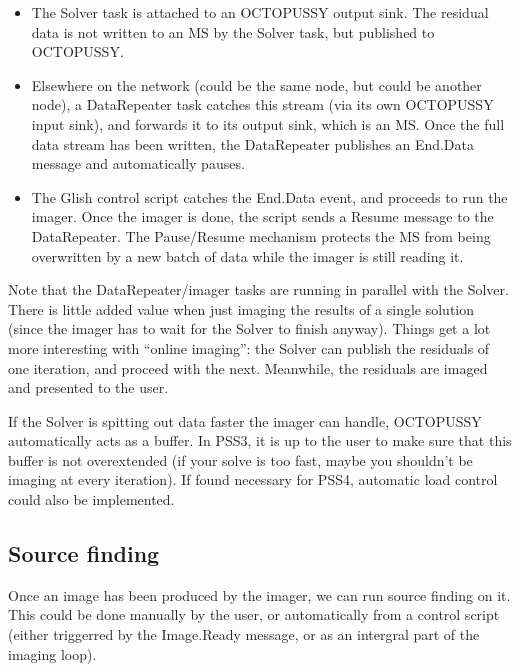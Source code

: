 \documentclass[12pt]{article}
\begin{document}
  \begin{itemize}
  
  \item The Solver task is attached to an OCTOPUSSY output sink. The residual
  data is not written to an MS by the Solver task, but published to OCTOPUSSY. 

  \item Elsewhere on the network (could be the same node, but could be another
  node), a DataRepeater task catches this stream (via its own OCTOPUSSY input
  sink), and forwards it to its output sink, which is an MS. Once the full data
  stream has been written, the DataRepeater publishes an End.Data message and
  automatically pauses.

  \item The Glish control script catches the End.Data event, and proceeds to
  run the imager. Once the imager is done, the script sends a Resume message to
  the DataRepeater. The Pause/Resume mechanism protects the MS from being
  overwritten by a new batch of data while the imager is still reading it.

  \end{itemize}
  
  Note that the DataRepeater/imager tasks are running in parallel with the
  Solver. There is little added value when just imaging the results of a single
  solution (since the imager has to wait for the Solver to finish anyway).
  Things get a lot more interesting with ``online imaging'': the Solver can
  publish the residuals of one iteration, and proceed with the next. Meanwhile,
  the residuals are imaged and presented to the user. 

  If the Solver is spitting out data faster the imager can handle, OCTOPUSSY
  automatically acts as a buffer. In PSS3, it is up to the user to make sure
  that this buffer is not overextended (if your solve is too fast, maybe you
  shouldn't be imaging at every iteration). If found necessary for PSS4,
  automatic load control could also be implemented.

\subsection{Source finding}

  Once an image has been produced by the imager, we can run source finding on
  it. This could be done manually by the user, or automatically from a control
  script (either triggerred by the Image.Ready message, or as an intergral part
  of the imaging loop).
\end{document}
